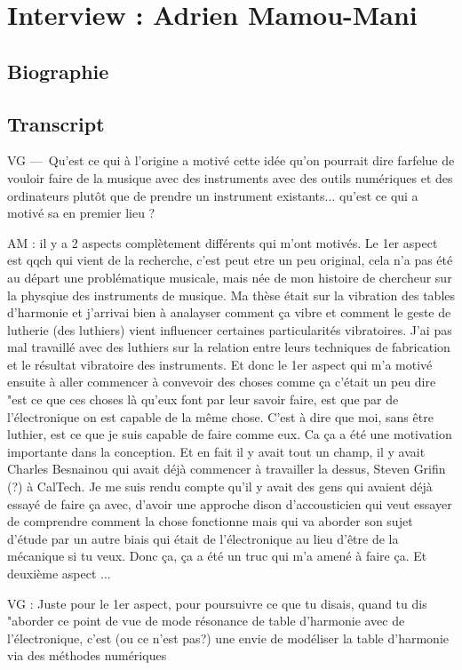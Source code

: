 \chapter{Interview : Adrien Mamou-Mani}

\section*{Biographie}

\section*{Transcript}

VG — Qu'est ce qui à l'origine a motivé cette idée qu'on pourrait dire farfelue de vouloir faire de la musique avec des instruments avec des outils numériques et des ordinateurs plutôt que de prendre un instrument existants... qu'est ce qui a motivé sa en premier lieu ?


AM : il y a 2 aspects complètement différents qui m'ont motivés. Le 1er aspect est qqch qui vient de la recherche, c'est peut etre un peu original, cela n'a pas été au départ une problématique musicale, mais née de mon histoire de chercheur sur la physqiue des instruments de musique. Ma thèse était sur la vibration des tables d'harmonie et j'arrivai bien à analayser comment ça vibre et comment le geste de lutherie (des luthiers) vient influencer certaines particularités vibratoires. J'ai pas mal travaillé avec des luthiers sur la relation entre leurs techniques de fabrication et le résultat vibratoire des instruments.
Et donc le 1er aspect qui m'a motivé ensuite à aller commencer à convevoir des choses comme ça c'était un peu dire "est ce que ces choses là qu'eux font par leur savoir faire, est que par de l'électronique on est capable de la même chose. C'est à dire que moi, sans être luthier, est ce que je suis capable de faire comme eux. Ca ça a été une motivation importante dans la conception. Et en fait il y avait tout un champ, il y avait Charles Besnainou qui avait déjà commencer à travailler la dessus, Steven Grifin (?) à CalTech. 
Je me suis rendu compte qu'il y avait des gens qui avaient déjà essayé de faire ça avec, d'avoir une approche dison d'accousticien qui veut essayer de comprendre comment la chose fonctionne mais qui va aborder son sujet d'étude par un autre biais qui était de l'électronique au lieu d'être de la mécanique si tu veux. 
Donc ça, ça a été un truc qui m'a amené à faire ça. Et deuxième aspect ...

VG : Juste pour le 1er aspect, pour poursuivre ce que tu disais, quand tu dis "aborder ce point de vue de mode résonance de table d'harmonie avec de l'électronique, c'est (ou ce n'est pas?) une envie de modéliser la table d'harmonie via des méthodes numériques

